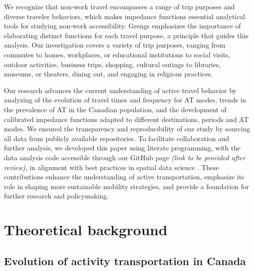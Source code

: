\documentclass[preprint, 3p,
authoryear]{elsarticle} %
\begin{document}
We recognize that non-work travel encompasses a range of trip purposes
and diverse traveler behaviors, which makes impedance functions
essential analytical tools for studying non-work accessibility. Grengs
\citeyearpar{grengs2015nonwork} emphasizes the importance of elaborating
distinct functions for each travel purpose, a principle that guides this
analysis. Our investigation covers a variety of trip purposes, ranging
from commutes to homes, workplaces, or educational institutions to
social visits, outdoor activities, business trips, shopping, cultural
outings to libraries, museums, or theaters, dining out, and engaging in
religious practices.

Our research advances the current understanding of active travel
behavior by analyzing of the evolution of travel times and frequency for
AT modes, trends in the prevalence of AT in the Canadian population, and
the development of calibrated impedance functions adapted to different
destinations, periods and AT modes. We ensured the transparency and
reproducibility of our study by sourcing all data from publicly
available repositories. To facilitate collaboration and further
analysis, we developed this paper using literate programming, with the
data analysis code accessible through our GitHub page \emph{(link to be
provided after review)}, in alignment with best practices in spatial
data science \citep{arribas-bel2021}. These contributions enhance the
understanding of active transportation, emphasize its role in shaping
more sustainable mobility strategies, and provide a foundation for
further research and policymaking.

\section{Theoretical background}\label{theoretical-background}

\subsection{Evolution of activity transportation in
Canada}\label{evolution-of-activity-transportation-in-canada}
\end{document}
